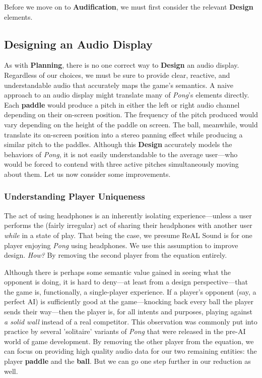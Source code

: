 \documentclass{report}
\newcommand{\rs}{ReAL Sound\xspace}
\newcommand{\plan}{\textbf{Planning}\xspace}
\newcommand{\design}{\textbf{Design}\xspace}
\newcommand{\audio}{\textbf{Audification}\xspace}
\newcommand{\pad}{\textbf{paddle}\xspace}
\newcommand{\ball}{\textbf{ball}\xspace}
\begin{document}
Before we move on to \audio, we must first consider the relevant \design elements. 

\subsection{Designing an Audio Display}
As with \plan, there is no one correct way to \design an audio display. Regardless of our choices, we must be sure to provide clear, reactive, and understandable audio that accurately maps the game's semantics. A naive approach to an audio display might translate many of \emph{Pong}'s elements directly. Each \pad would produce a pitch in either the left or right audio channel depending on their on-screen position. The frequency of the pitch produced would vary depending on the height of the paddle on screen. The ball, meanwhile, would translate its on-screen position into a stereo panning effect while producing a similar pitch to the paddles. Although this \design accurately models the behaviors of \emph{Pong}, it is not easily understandable to the average user---who would be forced to contend with three active pitches simultaneously moving about them. Let us now consider some improvements.

\subsubsection{Understanding Player Uniqueness}
The act of using headphones is an inherently isolating experience---unless a user performs the (fairly irregular) act of sharing their headphones with another user \emph{while} in a state of play. That being the case, we presume \rs is for one player enjoying \emph{Pong} using headphones. We use this assumption to improve design. \emph{How?} By removing the second player from the equation entirely. 

Although there is perhaps some semantic value gained in seeing what the opponent is doing, it is hard to deny---at least from a design perspective---that the game is, functionally, a single-player experience. If a player's opponent (say, a perfect AI) is sufficiently good at the game---knocking back every ball the player sends their way---then the player is, for all intents and purposes, playing against \emph{a solid wall} instead of a real competitor. This observation was commonly put into practice by several 'solitaire' variants of \emph{Pong} that were released in the pre-AI world of game development. By removing the other player from the equation, we can focus on providing high quality audio data for our two remaining entities: the player \pad and the \ball. But we can go one step further in our reduction as well. 
\end{document}
